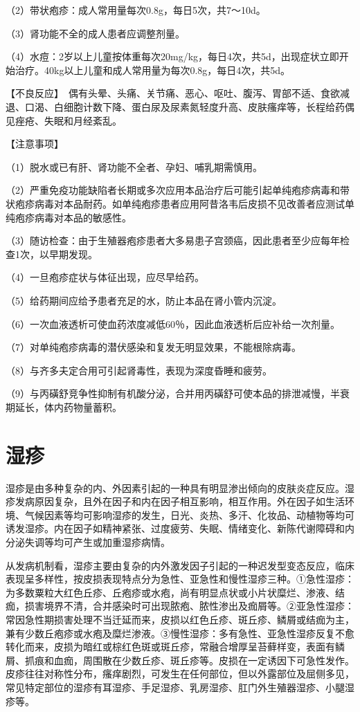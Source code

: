 （2）带状疱疹：成人常用量每次0.8g，每日5次，共7～10d。

（3）肾功能不全的成人患者应调整剂量。

（4）水痘：2岁以上儿童按体重每次20mg/kg，每日4次，共5d，出现症状立即开始治疗。40kg以上儿童和成人常用量为每次0.8g，每日4次，共5d。

【不良反应】　偶有头晕、头痛、关节痛、恶心、呕吐、腹泻、胃部不适、食欲减退、口渴、白细胞计数下降、蛋白尿及尿素氮轻度升高、皮肤瘙痒等，长程给药偶见痤疮、失眠和月经紊乱。

【注意事项】

（1）脱水或已有肝、肾功能不全者、孕妇、哺乳期需慎用。

（2）严重免疫功能缺陷者长期或多次应用本品治疗后可能引起单纯疱疹病毒和带状疱疹病毒对本品耐药。如单纯疱疹患者应用阿昔洛韦后皮损不见改善者应测试单纯疱疹病毒对本品的敏感性。

（3）随访检查：由于生殖器疱疹患者大多易患子宫颈癌，因此患者至少应每年检查1次，以早期发现。

（4）一旦疱疹症状与体征出现，应尽早给药。

（5）给药期间应给予患者充足的水，防止本品在肾小管内沉淀。

（6）一次血液透析可使血药浓度减低60％，因此血液透析后应补给一次剂量。

（7）对单纯疱疹病毒的潜伏感染和复发无明显效果，不能根除病毒。

（8）与齐多夫定合用可引起肾毒性，表现为深度昏睡和疲劳。

（9）与丙磺舒竞争性抑制有机酸分泌，合并用丙磺舒可使本品的排泄减慢，半衰期延长，体内药物量蓄积。

\section{湿疹}

湿疹是由多种复杂的内、外因素引起的一种具有明显渗出倾向的皮肤炎症反应。湿疹发病原因复杂，且外在因子和内在因子相互影响，相互作用。外在因子如生活环境、气候因素等均可影响湿疹的发生，日光、炎热、多汗、化妆品、动植物等均可诱发湿疹。内在因子如精神紧张、过度疲劳、失眠、情绪变化、新陈代谢障碍和内分泌失调等均可产生或加重湿疹病情。

从发病机制看，湿疹主要由复杂的内外激发因子引起的一种迟发型变态反应，临床表现呈多样性，按皮损表现特点分为急性、亚急性和慢性湿疹三种。①急性湿疹：为多数粟粒大红色丘疹、丘疱疹或水疱，尚有明显点状或小片状糜烂、渗液、结痂，损害境界不清，合并感染时可出现脓疱、脓性渗出及痂屑等。②亚急性湿疹：常因急性期损害处理不当迁延而来，皮损以红色丘疹、斑丘疹、鳞屑或结痂为主，兼有少数丘疱疹或水疱及糜烂渗液。③慢性湿疹：多有急性、亚急性湿疹反复不愈转化而来，皮损为暗红或棕红色斑或斑丘疹，常融合增厚呈苔藓样变，表面有鳞屑、抓痕和血痂，周围散在少数丘疹、斑丘疹等。皮损在一定诱因下可急性发作。皮疹往往对称性分布，瘙痒剧烈，可发生在任何部位，但以外露部位及屈侧多见，常见特定部位的湿疹有耳湿疹、手足湿疹、乳房湿疹、肛门外生殖器湿疹、小腿湿疹等。

